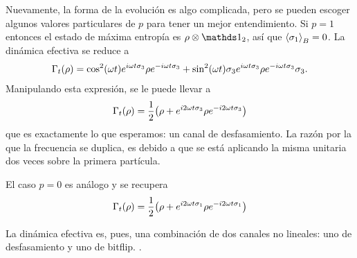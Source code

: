 Nuevamente, la forma de la evolución es algo complicada, pero se pueden escoger algunos valores particulares de $p$ para tener un mejor entendimiento. Si $p=1$ entonces el estado de máxima entropía es $\rho\otimes\Id_{2}$, así que $\expval{\sigma_{1}}_{B}=0$. La dinámica efectiva se reduce a
\begin{align*}
  \Gamma_{t}(\rho)=\cos^{2}(\omega t) e^{i\omega t \sigma_{3}}\rho e^{-i\omega t \sigma_{3}}+\sin^{2}(\omega t) \sigma_{3} e^{i\omega t \sigma_{3}}\rho e^{-i\omega t \sigma_{3}} \sigma_{3}.
\end{align*}
Manipulando esta expresión, se le puede llevar a 
\begin{equation*}
  \Gamma_{t}(\rho)=\frac{1}{2}\qty(\rho+e^{i 2 \omega t \sigma_{3}}\rho e^{-i 2 \omega t \sigma_{3}})
\end{equation*}
que es exactamente lo que esperamos: un canal de desfasamiento. La razón por la que la frecuencia se duplica, es debido a que se está aplicando la misma unitaria dos veces sobre la primera partícula. 


El caso $p=0$ es análogo y se recupera
\begin{equation*}
  \Gamma_{t}(\rho)=\frac{1}{2}\qty(\rho+e^{i 2 \omega t \sigma_{1}}\rho e^{-i 2 \omega t \sigma_{1}})
\end{equation*}

La dinámica efectiva es, pues, una combinación de dos canales no lineales: uno de desfasamiento y uno de bitflip. .

